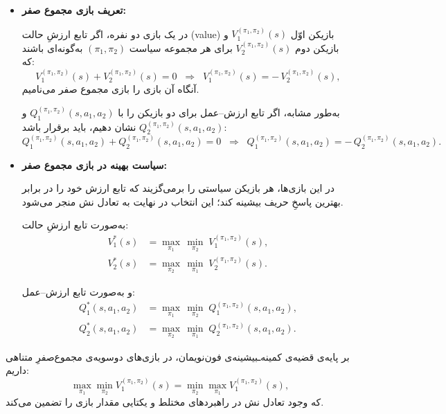 \begin{itemize}
	\item \textbf{تعریف بازی مجموع صفر:}
	
	در یک بازی دو نفره، اگر تابع ارزشِ حالت (value) بازیکن اوّل 
	\(V_1^{(\pi_1 ,\pi_2)}(s)\)
	و بازیکن دوم 
	\(V_2^{(\pi_1 ,\pi_2)}(s)\)
	برای هر مجموعه سیاست 
	\((\pi_1,\pi_2)\)
	به‌گونه‌ای باشند که:
	\begin{equation}\label{eq:game_v}
		V_1^{(\pi_1 ,\pi_2)}(s) + V_2^{(\pi_1 ,\pi_2)}(s) = 0 
		\;\;\Longrightarrow\;\;
		V_1^{(\pi_1 ,\pi_2)}(s) = -\,V_2^{(\pi_1 ,\pi_2)}(s),
	\end{equation}
	آنگاه آن بازی را {بازی مجموع صفر} می‌نامیم.
	
	به‌طور مشابه، اگر تابع ارزش–عمل برای دو بازیکن را با
	\(Q_1^{(\pi_1,\pi_2)}(s,a_1,a_2)\)
	و
	\(Q_2^{(\pi_1,\pi_2)}(s,a_1,a_2)\)
	نشان دهیم، باید برقرار باشد:
	\begin{equation}\label{eq:game_q}
		Q_1^{(\pi_1,\pi_2)}(s,a_1,a_2) + 
		Q_2^{(\pi_1,\pi_2)}(s,a_1,a_2) = 0
		\;\;\Longrightarrow\;\;
		Q_1^{(\pi_1,\pi_2)}(s,a_1,a_2) = -\,Q_2^{(\pi_1,\pi_2)}(s,a_1,a_2).
	\end{equation}
	
	\item \textbf{سیاست بهینه در بازی مجموع صفر:}
	
	در این بازی‌ها، هر بازیکن سیاستی را برمی‌گزیند که تابع ارزش خود را
	در برابر بهترین پاسخِ حریف بیشینه کند؛ این انتخاب در نهایت به
	تعادل نش منجر می‌شود.
	
	به‌صورت تابع ارزشِ حالت:
	\begin{align}
		V_1^*(s) &= \max_{\pi_1}\,\min_{\pi_2} \;
		V_1^{(\pi_1 ,\pi_2)}(s), \\
		V_2^*(s) &= \max_{\pi_2}\,\min_{\pi_1} \;
		V_2^{(\pi_1 ,\pi_2)}(s).
	\end{align}
	
	و به‌صورت تابع ارزش–عمل:
	\begin{align}
		Q_1^*(s,a_1,a_2) &= \max_{\pi_1}\,\min_{\pi_2} \;
		Q_1^{(\pi_1 ,\pi_2)}(s,a_1,a_2), \\
		Q_2^*(s,a_1,a_2) &= \max_{\pi_2}\,\min_{\pi_1} \;
		Q_2^{(\pi_1 ,\pi_2)}(s,a_1,a_2).
	\end{align}
\end{itemize}

بر پایه‌ی قضیه‌ی کمینه‌ـبیشینه‌ی فون‌نویمان، در بازی‌های دوسویه‌ی مجموع‌صفرِ متناهی داریم:
\[
\max_{\pi_1}\min_{\pi_2} V_1^{(\pi_1,\pi_2)}(s)
=
\min_{\pi_2}\max_{\pi_1} V_1^{(\pi_1,\pi_2)}(s),
\]
که وجود تعادل نش در راهبردهای مختلط و یکتایی مقدار بازی را تضمین می‌کند.


